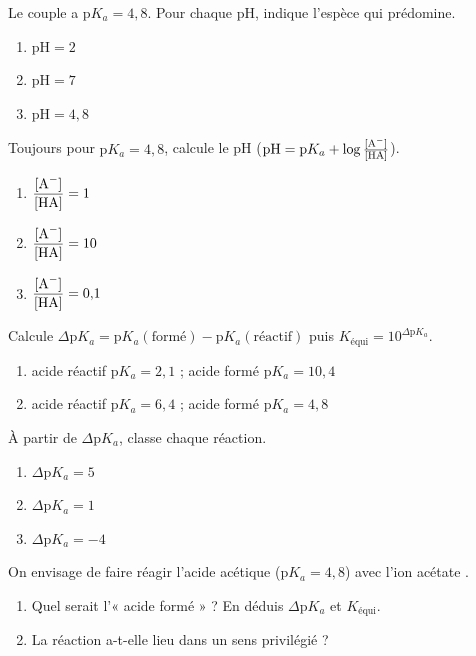 \documentclass[11pt,a4paper]{article}
\begin{document}

\begin{exo}
Le couple  a $\mathrm{p}K_a = 4{,}8$. Pour chaque pH, indique l'espèce qui prédomine.
\begin{enumerate}[label=\alph*)]
  \item $\mathrm{pH} = 2$
  \item $\mathrm{pH} = 7$
  \item $\mathrm{pH} = 4{,}8$
\end{enumerate}
\end{exo}

\begin{exo}
Toujours pour $\mathrm{p}K_a = 4{,}8$, calcule le pH ($\mathrm{pH} = \mathrm{p}K_a + \log\frac{[\ce{A-}]}{[\ce{HA}]}$).
\begin{enumerate}[label=\alph*)]
  \item $\dfrac{[\ce{A-}]}{[\ce{HA}]} = 1$
  \item $\dfrac{[\ce{A-}]}{[\ce{HA}]} = 10$
  \item $\dfrac{[\ce{A-}]}{[\ce{HA}]} = 0{,}1$
\end{enumerate}
\end{exo}

\begin{exo}
Calcule $\Delta\mathrm{p}K_a = \mathrm{p}K_a(\text{formé}) - \mathrm{p}K_a(\text{réactif})$ puis
$K_{\text{équi}} = 10^{\Delta\mathrm{p}K_a}$.
\begin{enumerate}[label=\alph*)]
  \item acide réactif $\mathrm{p}K_a = 2{,}1$ ; acide formé $\mathrm{p}K_a = 10{,}4$
  \item acide réactif $\mathrm{p}K_a = 6{,}4$ ; acide formé $\mathrm{p}K_a = 4{,}8$
\end{enumerate}
\end{exo}

\begin{exo}
À partir de $\Delta\mathrm{p}K_a$, classe chaque réaction.
\begin{enumerate}[label=\alph*)]
  \item $\Delta\mathrm{p}K_a = 5$
  \item $\Delta\mathrm{p}K_a = 1$
  \item $\Delta\mathrm{p}K_a = -4$
\end{enumerate}
\end{exo}

\begin{exo}
On envisage de faire réagir l'acide acétique  ($\mathrm{p}K_a = 4{,}8$) avec l'ion acétate
.
\begin{enumerate}[label=\alph*)]
  \item Quel serait l'« acide formé » ? En déduis $\Delta\mathrm{p}K_a$ et $K_{\text{équi}}$.
  \item La réaction a-t-elle lieu dans un sens privilégié ?
\end{enumerate}
\end{exo}
\end{document}
